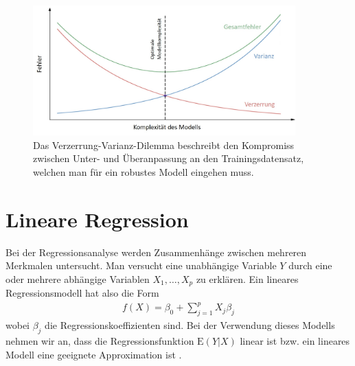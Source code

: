 \begin{figure}
\centering
\includegraphics[width = 0.9\textwidth]{figures/bias_variance_tradeoff_labeled.jpg}
\caption{Das Verzerrung-Varianz-Dilemma beschreibt den Kompromiss zwischen Unter- und Überanpassung an den Trainingsdatensatz, welchen man für ein robustes Modell eingehen muss.}
\label{bias_variance_tradeoff}
\end{figure}




\section{Lineare Regression}

Bei der Regressionsanalyse werden Zusammenhänge zwischen
mehreren Merkmalen untersucht. Man versucht eine unabhängige Variable $Y$ durch eine oder mehrere abhängige Variablen $X_1, \ldots, X_p$ zu erklären. Ein lineares Regressionsmodell hat also die Form
\begin{align}
\label{linear_model}
f(X) = \beta_0 + \sum_{j=1}^p X_j\beta_j
\end{align}
wobei $\beta_j$ die Regressionskoeffizienten sind. Bei der Verwendung dieses Modells nehmen wir an, dass die Regressionsfunktion $\text{E}(Y|X)$ linear ist bzw. ein lineares Modell eine geeignete Approximation ist \cite{hastie_elements}.

